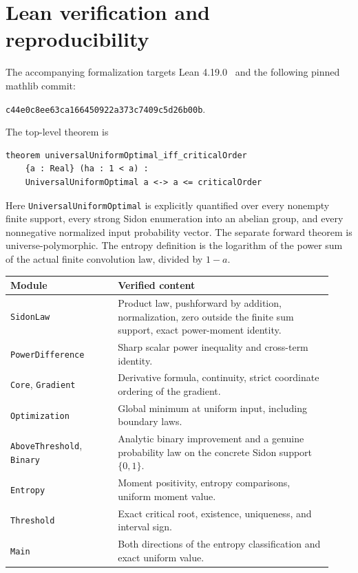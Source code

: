 \documentclass[11pt,a4paper]{article}
\newcommand{\code}[1]{\texttt{\small #1}}
\begin{document}
\section{Lean verification and reproducibility}\label{sec:lean}

The accompanying formalization targets Lean 4.19.0~\cite{Lean} and the following
pinned mathlib commit:
\begin{center}
\code{c44e0c8ee63ca166450922a373c7409c5d26b00b}.
\end{center}
The top-level theorem is
\begin{verbatim}
theorem universalUniformOptimal_iff_criticalOrder
    {a : Real} (ha : 1 < a) :
    UniversalUniformOptimal a <-> a <= criticalOrder
\end{verbatim}
Here \code{UniversalUniformOptimal} is explicitly quantified over every
nonempty finite support, every strong Sidon enumeration into an abelian
group, and every nonnegative normalized input probability
vector. The separate forward theorem is universe-polymorphic.
The entropy definition is the logarithm of the power sum of the actual
finite convolution law, divided by $1-a$.

\begin{center}
\begin{tabular}{@{}p{0.31\linewidth}p{0.62\linewidth}@{}}
\toprule
Module & Verified content\\
\midrule
\code{SidonLaw} & Product law, pushforward by addition, normalization,
zero outside the finite sum support, exact power-moment identity.\\
\code{PowerDifference} & Sharp scalar power inequality and cross-term identity.\\
\code{Core}, \code{Gradient} & Derivative formula, continuity, strict coordinate
ordering of the gradient.\\
\code{Optimization} & Global minimum at uniform input, including boundary laws.\\
\code{AboveThreshold}, \code{Binary} & Analytic binary improvement and a genuine
probability law on the concrete Sidon support $\{0,1\}$.\\
\code{Entropy} & Moment positivity, entropy comparisons, uniform moment value.\\
\code{Threshold} & Exact critical root, existence, uniqueness, and interval sign.\\
\code{Main} & Both directions of the entropy classification and exact uniform value.\\
\bottomrule
\end{tabular}
\end{center}
\end{document}
